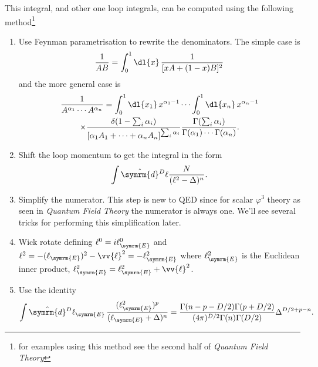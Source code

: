 \documentclass[fleqn]{NotesClass}
\newcommand*{\course}[1]{\textit{#1}}
\newcommand{\dhat}[1]{\hat{\symrm{d}}{#1}}
\begin{document}
    This integral, and other one loop integrals, can be computed using the following method\footnote{for examples using this method see the second half of \course{Quantum Field Theory}}
    \begin{enumerate}
        \item Use Feynman parametrisation to rewrite the denominators.
        The simple case is
        \begin{equation}
            \frac{1}{AB} = \int_0^1 \dl{x} \, \frac{1}{[xA + (1 - x)B]^2}
        \end{equation}
        and the more general case is
        \begin{multline*}
            \frac{1}{A^{\alpha_1} \dotsm A^{\alpha_n}} = \int_0^1 \dl{x_1} \, x^{\alpha_1 - 1} \dotsm \int_0^1 \dl{x_n} \, x^{\alpha_n - 1}\\
            \times \frac{\delta(1 - \sum_i \alpha_i)}{[\alpha_1 A_1 + \dotsb + \alpha_n A_n]^{\sum_i \alpha_i}} \frac{\Gamma(\sum_i \alpha_i)}{\Gamma(\alpha_1) \dotsm \Gamma(\alpha_n)}.
        \end{multline*}
        \item Shift the loop momentum to get the integral in the form
        \begin{equation}
            \int \dhat{^D\ell} \frac{N}{(\ell^2 - \Delta)^n}.
        \end{equation}
        \item Simplify the numerator. This step is new to QED since for scalar \(\varphi^3\) theory as seen in \course{Quantum Field Theory} the numerator is always one.
        We'll see several tricks for performing this simplification later.
        \item Wick rotate defining \(\ell^0 = i\ell^0_{\symrm{E}}\) and \(\ell^2 = -(\ell_{\symrm{E}})^2 - \vv{\ell}^2 = -\ell_{\symrm{E}}^2\) where \(\ell_{\symrm{E}}^2\) is the Euclidean inner product, \(\ell_{\symrm{E}}^2 = \ell_{\symrm{E}}^2 + \vv{\ell}^2\).
        \item Use the identity
        \begin{equation}
            \int \dhat{^D\ell_{\symrm{E}}} \, \frac{(\ell_{\symrm{E}}^2)^p}{(\ell_{\symrm{E}} + \Delta)^n} = \frac{\Gamma(n - p - D/2)\Gamma(p + D/2)}{(4\pi)^{D/2}\Gamma(n)\Gamma(D/2)} \Delta^{D/2 + p - n}.
        \end{equation}
    \end{enumerate}
    
\end{document}

